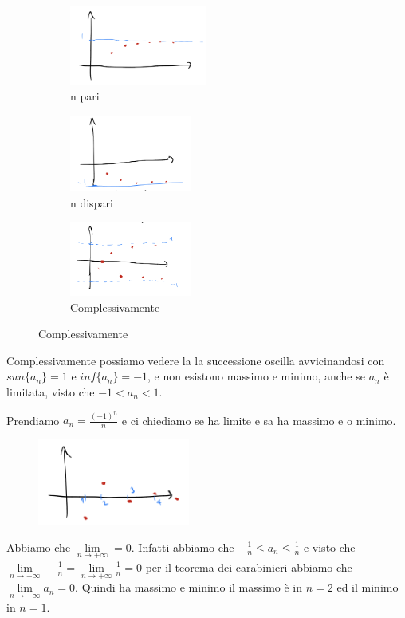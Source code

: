 \begin{figure}[h!]
\centering
\begin{subfigure}{.3\textwidth}
    \vspace{-25pt}
    \centering
    \includegraphics[width=4.5cm]{images/esempio-mas-min-succesioni-1.png}
    \caption{n pari}
\end{subfigure}
\begin{subfigure}{.3\textwidth}
    \centering
    \includegraphics[width=4cm]{images/esempio-mas-min-succesioni-2.png}
    \caption{n dispari}
\end{subfigure}
\begin{subfigure}{.3\textwidth}
    \centering
    \includegraphics[width=4cm]{images/esempio-mas-min-succesioni-3.png}
    \caption{Complessivamente}
\end{subfigure}
\end{figure}
\hspace{-15pt}Complessivamente possiamo vedere la la successione oscilla avvicinandosi con $sun\{a_n\} = 1$ e $inf\{a_n\} = -1$, e non esistono massimo e minimo, anche se $a_n$ è limitata, visto che $-1 < a_n < 1$.

\newpage
\begin{example}
Prendiamo $a_n = \frac{(-1)^n}{n}$ e ci chiediamo se ha limite e sa ha massimo e o minimo.
\end{example}
\begin{figure}
    \vspace{-15pt}
    \centering
    \includegraphics[width=5cm]{images/esempio-mas-min-successioni-4.png}
\end{figure}
Abbiamo che $\lim\limits_{n\to +\infty} = 0$. Infatti abbiamo che $-\frac{1}{n} \leq a_n \leq \frac{1}{n}$ e visto che $\lim\limits_{n\to +\infty}-\frac{1}{n}=\lim\limits_{n\to +\infty}\frac{1}{n} = 0$ per il teorema dei carabinieri abbiamo che $\lim\limits_{n\to +\infty}a_n = 0$. Quindi ha massimo e minimo il massimo è in $n=2$ ed il minimo in $n=1$.\\\\

